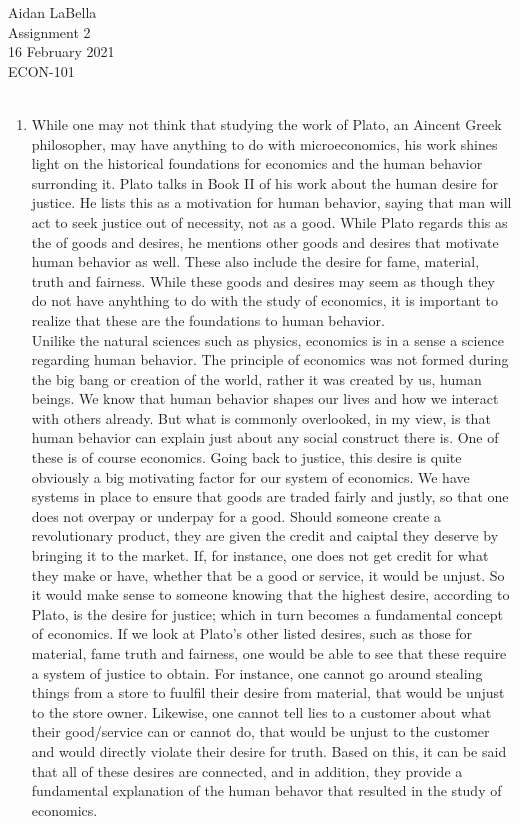 \documentclass[12pt]{article}
\begin{document}
\noindent
Aidan LaBella \\
Assignment 2 \\ 
16 February 2021\\
ECON-101 \\
\\
\begin{enumerate}
\item
    \indent 
    While one may not think that studying the work of Plato, an Aincent Greek philosopher, may have anything to do with microeconomics, his work  shines light on the historical foundations for economics and the human behavior surronding it. Plato talks in Book II of his work about the human desire for justice. He lists this as a motivation for human behavior, saying that man will act to seek justice out of necessity, not as a good. While Plato regards this as the  of goods and desires, he mentions other goods and desires that motivate human behavior as well. These also include the desire for fame, material, truth and fairness. While these goods and desires may seem as though they do not have anyhthing to do with the study of economics, it is important to realize that these are the foundations to human behavior.  \\
    \indent
    Unilike the natural sciences such as physics, economics is in a sense a science regarding human behavior. The principle of economics was not formed during the big bang or creation of the world, rather it was created by us, human beings. We know that human behavior shapes our lives and how we interact with others already. But what is commonly overlooked, in my view, is that human behavior can explain just about any social construct there is. One of these is of course economics. Going back to justice, this desire is quite obviously a big motivating factor for our system of economics. We have systems in place to ensure that goods are traded fairly and justly, so that one does not overpay or underpay for a good. Should someone create a revolutionary product, they are given the credit and caiptal they deserve by bringing it to the market. If, for instance, one does not get credit for what they make or have, whether that be a good or service, it would be unjust. So it would make sense to someone knowing that the highest desire, according to Plato, is the desire for justice; which in turn becomes a fundamental concept of economics. If we look at Plato's other listed desires, such as those for material, fame truth and fairness, one would be able to see that these require a system of justice to obtain. For instance, one cannot go around stealing things from a store to fuulfil their desire from material, that would be unjust to the store owner. Likewise, one cannot tell lies to a customer about what their good/service can or cannot do, that would be unjust to the customer and would directly violate their desire for truth. Based on this, it can be said that all of these desires are connected, and in addition, they provide a fundamental explanation of the human behavor that resulted in the study of economics.

\end{enumerate}
\end{document}
